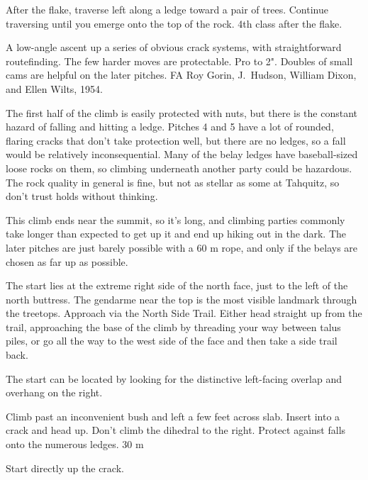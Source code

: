 \documentclass{tahquitz}
\begin{document}
 After the flake, traverse left along a ledge toward a pair of trees. Continue
traversing until you emerge onto the top of the rock. 4th class after the flake.

\northgully




A low-angle ascent up a series of obvious crack systems, with straightforward
routefinding.  The few harder moves are protectable. Pro to 2".
Doubles of small cams are helpful on the later pitches.  FA Roy Gorin,
J.~Hudson, William Dixon, and Ellen Wilts, 1954.

The first half of the climb is easily protected with nuts, but there
is the constant hazard of falling and hitting a ledge. Pitches 4 and 5
have a lot of rounded, flaring cracks that don't take protection well,
but there are no ledges, so a fall would be relatively inconsequential.
Many of the belay ledges have baseball-sized loose rocks on them, so
climbing underneath another party could be hazardous. The rock quality
in general is fine, but not as stellar as some at Tahquitz, so don't
trust holds without thinking.

This climb ends near the summit, so it's long, and climbing parties
commonly take longer than expected to get up it and end up hiking out
in the dark.  The later pitches are just barely possible with a 60 m
rope, and only if the belays are chosen as far up as possible.

The start lies at  the extreme right side of the north face, just to
the left of the north buttress. The gendarme near the top is the most
visible landmark through the treetops. Approach via the North Side Trail.
Either head straight up from the trail, approaching the base of the climb by threading your
way between talus piles, or go all the way to the west side of the face
and then take a side trail back. 

The start can be located by looking for the distinctive left-facing
overlap and overhang on the right.

\somespace

 Climb past an inconvenient bush and left a few feet across slab.
Insert into a crack and head up. Don't climb the dihedral to the right. 
Protect against falls onto the numerous ledges.
30 m

 Start directly up the crack.
\end{document}

